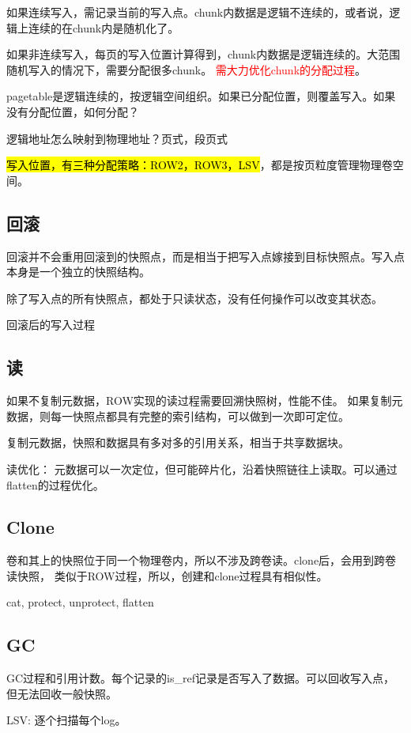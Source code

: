 如果连续写入，需记录当前的写入点。chunk内数据是逻辑不连续的，或者说，逻辑上连续的在chunk内是随机化了。

如果非连续写入，每页的写入位置计算得到，chunk内数据是逻辑连续的。大范围随机写入的情况下，需要分配很多chunk。
\textcolor{red}{需大力优化chunk的分配过程}。

pagetable是逻辑连续的，按逻辑空间组织。如果已分配位置，则覆盖写入。如果没有分配位置，如何分配？

逻辑地址怎么映射到物理地址？页式，段页式

\hl{写入位置，有三种分配策略：ROW2，ROW3，LSV}，都是按页粒度管理物理卷空间。

\subsection{回滚}

回滚并不会重用回滚到的快照点，而是相当于把写入点嫁接到目标快照点。写入点本身是一个独立的快照结构。

除了写入点的所有快照点，都处于只读状态，没有任何操作可以改变其状态。

回滚后的写入过程

\subsection{读}

如果不复制元数据，ROW实现的读过程需要回溯快照树，性能不佳。
如果复制元数据，则每一快照点都具有完整的索引结构，可以做到一次即可定位。

复制元数据，快照和数据具有多对多的引用关系，相当于共享数据块。

读优化： 元数据可以一次定位，但可能碎片化，沿着快照链往上读取。可以通过flatten的过程优化。

\subsection{Clone}

卷和其上的快照位于同一个物理卷内，所以不涉及跨卷读。clone后，会用到跨卷读快照，
类似于ROW过程，所以，创建和clone过程具有相似性。

cat, protect, unprotect, flatten

\subsection{GC}

GC过程和引用计数。每个记录的is\_ref记录是否写入了数据。可以回收写入点，但无法回收一般快照。

LSV: 逐个扫描每个log。
